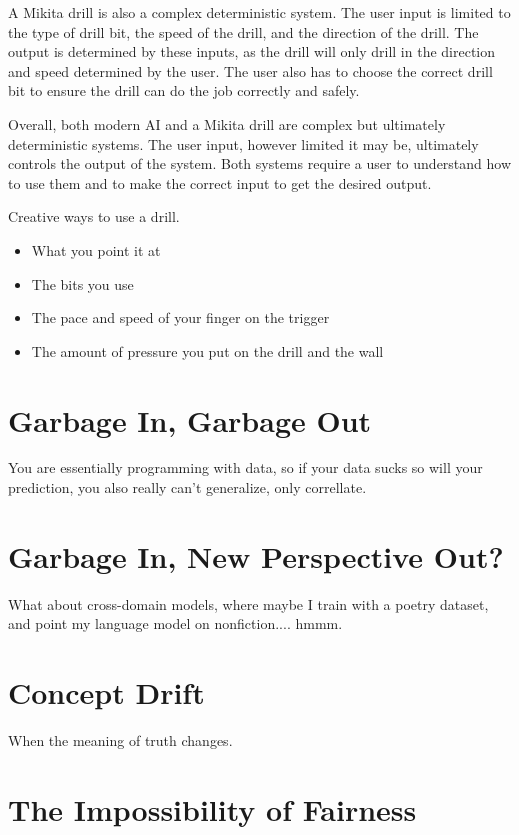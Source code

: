 A Mikita drill is also a complex deterministic system. The user input is limited to the type of drill bit, the speed of the drill, and the direction of the drill. The output is determined by these inputs, as the drill will only drill in the direction and speed determined by the user. The user also has to choose the correct drill bit to ensure the drill can do the job correctly and safely.

Overall, both modern AI and a Mikita drill are complex but ultimately deterministic systems. The user input, however limited it may be, ultimately controls the output of the system. Both systems require a user to understand how to use them and to make the correct input to get the desired output.

Creative ways to use a drill.
\begin{itemize}
\item What you point it at
\item The bits you use
\item The pace and speed of your finger on the trigger
\item The amount of pressure you put on the drill and the wall
\end{itemize}


\section{Garbage In, Garbage Out}

You are essentially programming with data, so if your data sucks so will your prediction, you also really can't generalize, only correllate.

\section{Garbage In, New Perspective Out?}

What about cross-domain models, where maybe I train with a poetry dataset, and point my language model on nonfiction.... hmmm.

\section{Concept Drift}

When the meaning of truth changes.

\section{The Impossibility of Fairness}

